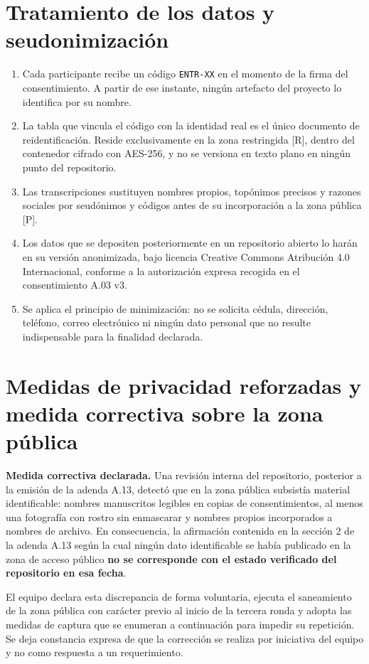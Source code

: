 \documentclass[11pt,a4paper]{article}
\begin{document}
\section{Tratamiento de los datos y seudonimización}

\begin{enumerate}[leftmargin=*,itemsep=2pt]
  \item Cada participante recibe un código \texttt{ENTR-XX} en el momento de la firma del consentimiento.
        A partir de ese instante, ningún artefacto del proyecto lo identifica por su nombre.
  \item La tabla que vincula el código con la identidad real es el único documento de reidentificación.
        Reside exclusivamente en la zona restringida [R], dentro del contenedor cifrado con AES-256, y no
        se versiona en texto plano en ningún punto del repositorio.
  \item Las transcripciones sustituyen nombres propios, topónimos precisos y razones sociales por
        seudónimos y códigos antes de su incorporación a la zona pública [P].
  \item Los datos que se depositen posteriormente en un repositorio abierto lo harán en su versión
        anonimizada, bajo licencia Creative Commons Atribución 4.0 Internacional, conforme a la
        autorización expresa recogida en el consentimiento A.03 v3.
  \item Se aplica el principio de minimización: no se solicita cédula, dirección, teléfono, correo
        electrónico ni ningún dato personal que no resulte indispensable para la finalidad declarada.
\end{enumerate}

\section{Medidas de privacidad reforzadas y medida correctiva sobre la zona pública}

\begin{tcolorbox}[colback=red!4,colframe=red!55!black,boxrule=0.8pt,arc=2pt,left=6pt,right=6pt,top=5pt,bottom=5pt]
\textbf{Medida correctiva declarada.} Una revisión interna del repositorio, posterior a la emisión de la
adenda A.13, detectó que en la zona pública subsistía material identificable: nombres manuscritos legibles
en copias de consentimientos, al menos una fotografía con rostro sin enmascarar y nombres propios
incorporados a nombres de archivo. En consecuencia, la afirmación contenida en la sección 2 de la adenda
A.13 según la cual ningún dato identificable se había publicado en la zona de acceso público
\textbf{no se corresponde con el estado verificado del repositorio en esa fecha}.

El equipo declara esta discrepancia de forma voluntaria, ejecuta el saneamiento de la zona pública con
carácter previo al inicio de la tercera ronda y adopta las medidas de captura que se enumeran a
continuación para impedir su repetición. Se deja constancia expresa de que la corrección se realiza por
iniciativa del equipo y no como respuesta a un requerimiento.
\end{tcolorbox}
\end{document}

